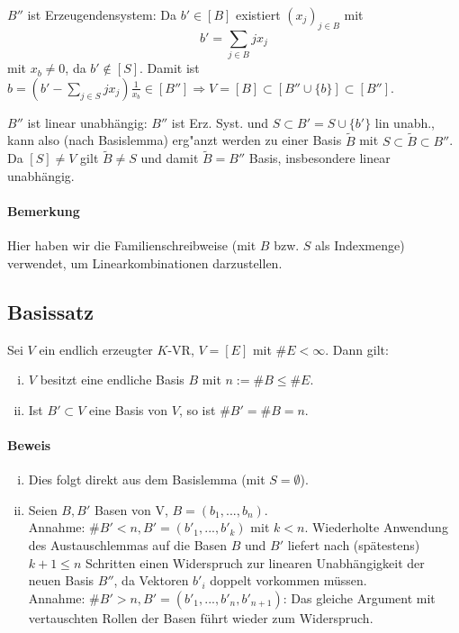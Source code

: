     $B''$ ist Erzeugendensystem: Da $b'\in [B]$ existiert $(x_j)_{j\in B}$ mit $$b' = \sum_{j\in B} jx_j $$ mit $x_b \neq 0$, da $b' \notin [S]$.
    Damit ist $b=(b'-\sum_{j\in S} jx_j)\frac{1}{x_b} \in [B''] \Rightarrow V = [B] \subset [B'' \cup \{b\}] \subset [B'']$.
    
    $B''$ ist linear unabhängig: $B''$ ist Erz. Syst. und $S\subset B' = S \cup \{b'\}$ lin unabh., kann also (nach Basislemma) erg"anzt werden zu einer Basis $\tilde{B}$ mit $S\subset \tilde{B}\subset B''$.
    Da $[S] \neq V$ gilt $\tilde{B} \neq S$ und damit $\tilde{B} = B''$ Basis, insbesondere linear unabhängig.
    
\paragraph{Bemerkung}
    Hier haben wir die Familienschreibweise (mit $B$ bzw. $S$ als Indexmenge) verwendet, um Linearkombinationen darzustellen.
    
\subsection{Basissatz}
	\begin{Satz}[Basissatz]
	Sei $V$ ein endlich erzeugter $K$-VR, $V=[E]$ mit $\#E < \infty$. Dann gilt:
	\begin{enumerate}[(i)]
		\item $V$ besitzt eine endliche Basis $B$ mit $n:= \#B \leq \#E$.
		\item Ist $B'\subset V$ eine Basis von $V$, so ist $\#B' = \#B = n$.
	\end{enumerate}
	\end{Satz}
    
\paragraph{Beweis}
    \begin{enumerate}[(i)]
        \item  Dies folgt direkt aus dem Basislemma (mit $S=\emptyset$).
        \item Seien $B,B'$ Basen von V, $B = (b_1,...,b_n)$.\\
        Annahme: $\#B' < n, B' = (b'_1,...,b'_k)$ mit $k < n$. Wiederholte Anwendung des Austauschlemmas auf die Basen $B$ und $B'$ liefert nach (spätestens) $k+1\leq n$ Schritten einen Widerspruch zur linearen Unabhängigkeit der neuen Basis $B''$, da Vektoren $b'_i$ doppelt vorkommen müssen.\\
        Annahme: $\#B' > n, B' = (b'_1,...,b'_n,b'_{n+1})$: Das gleiche Argument mit vertauschten Rollen der Basen führt wieder zum Widerspruch.
     \end{enumerate}

